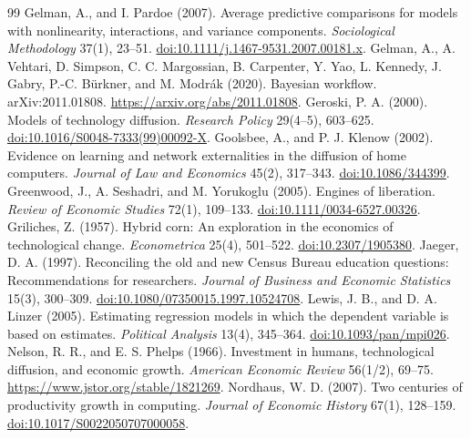 \documentclass[11pt]{article}
\begin{document}
\begin{thebibliography}{99}
 Gelman, A., and I. Pardoe (2007). Average predictive comparisons for models with nonlinearity, interactions, and variance components. \emph{Sociological Methodology} 37(1), 23--51. \href{https://doi.org/10.1111/j.1467-9531.2007.00181.x}{doi:10.1111/j.1467-9531.2007.00181.x}.
 Gelman, A., A. Vehtari, D. Simpson, C. C. Margossian, B. Carpenter, Y. Yao, L. Kennedy, J. Gabry, P.-C. B{\"u}rkner, and M. Modr{\'a}k (2020). Bayesian workflow. arXiv:2011.01808. \url{https://arxiv.org/abs/2011.01808}.
 Geroski, P. A. (2000). Models of technology diffusion. \emph{Research Policy} 29(4--5), 603--625. \href{https://doi.org/10.1016/S0048-7333(99)00092-X}{doi:10.1016/S0048-7333(99)00092-X}.
 Goolsbee, A., and P. J. Klenow (2002). Evidence on learning and network externalities in the diffusion of home computers. \emph{Journal of Law and Economics} 45(2), 317--343. \href{https://doi.org/10.1086/344399}{doi:10.1086/344399}.
 Greenwood, J., A. Seshadri, and M. Yorukoglu (2005). Engines of liberation. \emph{Review of Economic Studies} 72(1), 109--133. \href{https://doi.org/10.1111/0034-6527.00326}{doi:10.1111/0034-6527.00326}.
 Griliches, Z. (1957). Hybrid corn: An exploration in the economics of technological change. \emph{Econometrica} 25(4), 501--522. \href{https://doi.org/10.2307/1905380}{doi:10.2307/1905380}.
 Jaeger, D. A. (1997). Reconciling the old and new Census Bureau education questions: Recommendations for researchers. \emph{Journal of Business and Economic Statistics} 15(3), 300--309. \href{https://doi.org/10.1080/07350015.1997.10524708}{doi:10.1080/07350015.1997.10524708}.
 Lewis, J. B., and D. A. Linzer (2005). Estimating regression models in which the dependent variable is based on estimates. \emph{Political Analysis} 13(4), 345--364. \href{https://doi.org/10.1093/pan/mpi026}{doi:10.1093/pan/mpi026}.
 Nelson, R. R., and E. S. Phelps (1966). Investment in humans, technological diffusion, and economic growth. \emph{American Economic Review} 56(1/2), 69--75. \url{https://www.jstor.org/stable/1821269}.
 Nordhaus, W. D. (2007). Two centuries of productivity growth in computing. \emph{Journal of Economic History} 67(1), 128--159. \href{https://doi.org/10.1017/S0022050707000058}{doi:10.1017/S0022050707000058}.

\end{thebibliography}
\end{document}
